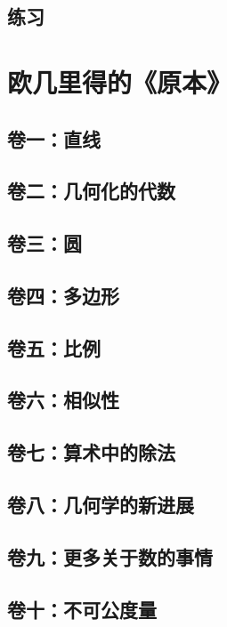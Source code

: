 \documentclass[cn,fancy,blue,11pt]{elegantbook}
\begin{document}
\section{练习}

\chapter{欧几里得的《原本》}

\section{卷一：直线}

\section{卷二：几何化的代数}

\section{卷三：圆}

\section{卷四：多边形}

\section{卷五：比例}

\section{卷六：相似性}

\section{卷七：算术中的除法}

\section{卷八：几何学的新进展}

\section{卷九：更多关于数的事情}

\section{卷十：不可公度量}
\end{document}
